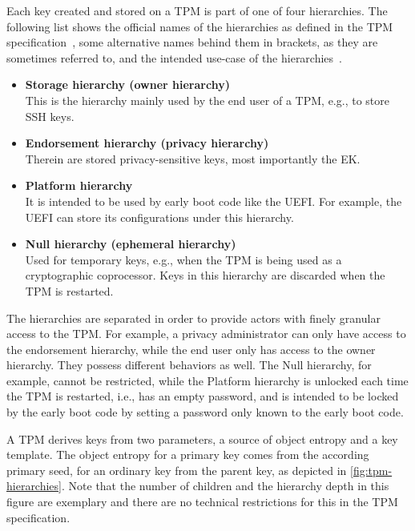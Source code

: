 Each key created and stored on a TPM is part of one of four hierarchies.
The following list shows the official names of the hierarchies as defined in the TPM specification~\cite{tpm20}, some alternative names behind them in brackets, as they are sometimes referred to, and the intended use-case of the hierarchies~\cite{Arthur2015}.
\begin{itemize}

  \item{\textbf{Storage hierarchy (owner hierarchy)}\\
  This is the hierarchy mainly used by the end user of a TPM, e.g., to store SSH keys.}

  \item{\textbf{Endorsement hierarchy (privacy hierarchy)}\\
  Therein are stored privacy-sensitive keys, most importantly the EK.}

  \item{\textbf{Platform hierarchy}\\
  It is intended to be used by early boot code like the UEFI\@.
  For example, the UEFI can store its configurations under this hierarchy.}

  \item{\textbf{Null hierarchy (ephemeral hierarchy)}\\
  Used for temporary keys, e.g., when the TPM is being used as a cryptographic coprocessor.
  Keys in this hierarchy are discarded when the TPM is restarted.}

\end{itemize}


The hierarchies are separated in order to provide actors with finely granular access to the TPM\@.
For example, a privacy administrator can only have access to the endorsement hierarchy, while the end user only has access to the owner hierarchy.
They possess different behaviors as well.
The Null hierarchy, for example, cannot be restricted, while the Platform hierarchy is unlocked each time the TPM is restarted, i.e., has an empty password, and is intended to be locked by the early boot code by setting a password only known to the early boot code.



A TPM derives keys from two parameters, a source of object entropy and a key template.
The object entropy for a primary key comes from the according primary seed, for an ordinary key from the parent key, as depicted in \autoref{fig:tpm-hierarchies}.
Note that the number of children and the hierarchy depth in this figure are exemplary and there are no technical restrictions for this in the TPM specification.

